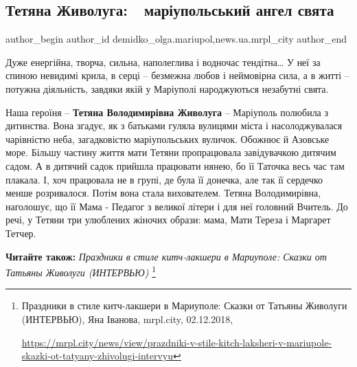  
 
 
 
 
 
\subsection{Тетяна Живолуга:\ \ маріупольський ангел свята}
\label{sec:25_02_2019.stz.news.ua.mrpl_city.1.tetjana_zhivoluga_mrpl_angel_svjata}
 
\ifcmt
 author_begin
   author_id demidko_olga.mariupol,news.ua.mrpl_city
 author_end
\fi

Дуже енергійна, творча, сильна, наполеглива і водночас тендітна… У неї за
спиною невидимі крила, в серці – безмежна любов і неймовірна сила, а в житті –
потужна діяльність, завдяки якій у Маріуполі народжуються незабутні свята.


Наша героїня – \textbf{Тетяна Володимирівна Живолуга} – Маріуполь полюбила з дитинства.
Вона згадує, як з батьками гуляла вулицями міста і насолоджувалася чарівністю
неба, загадковістю маріупольських вуличок. Обожнює й Азовське море. Більшу
частину життя мати Тетяни пропрацювала завідувачкою дитячим садом. А в дитячий
садок прийшла працювати нянею, бо її Таточка весь час там плакала. І, хоч
працювала не в групі, де була її донечка, але так її сердечко менше
розривалося. Потім вона стала вихователем. Тетяна Володимирівна, наголошує, що
її Мама - Педагог з великої літери і для неї головний Вчитель. До речі, у
Тетяни три улюблених жіночих образи: мама, Мати Тереза і Маргарет Тетчер.

\textbf{Читайте також:} \emph{Праздники в стиле китч-лакшери в Мариуполе: Сказки от Татьяны Живолуги (ИНТЕРВЬЮ)}%
\footnote{Праздники в стиле китч-лакшери в Мариуполе: Сказки от Татьяны Живолуги (ИНТЕРВЬЮ), Яна Іванова, mrpl.city, 02.12.2018, \par
\url{https://mrpl.city/news/view/prazdniki-v-stile-kitch-laksheri-v-mariupole-skazki-ot-tatyany-zhivolugi-intervyu}
}

